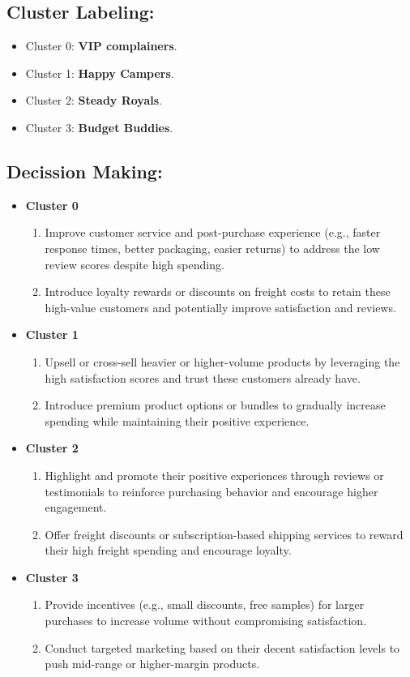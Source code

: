 \documentclass[a4paper,12pt]{article}
\begin{document}
\subsection{Cluster Labeling:}
\begin{itemize}
    \item Cluster 0: \textbf{VIP complainers}.
    \item Cluster 1: \textbf{Happy Campers}.
    \item Cluster 2: \textbf{Steady Royals}.
    \item Cluster 3: \textbf{Budget Buddies}.
\end{itemize}

\subsection*{Decission Making:}
\begin{itemize}
    \item \textbf{Cluster 0}
    \begin{enumerate}
        \item Improve customer service and post-purchase experience (e.g., faster response times, better packaging, easier returns) to address the low review scores despite high spending.
        \item Introduce loyalty rewards or discounts on freight costs to retain these high-value customers and potentially improve satisfaction and reviews.
    \end{enumerate}

    \item \textbf{Cluster 1}
    \begin{enumerate}
        \item Upsell or cross-sell heavier or higher-volume products by leveraging the high satisfaction scores and trust these customers already have.
        \item Introduce premium product options or bundles to gradually increase spending while maintaining their positive experience.
    \end{enumerate}

    \item \textbf{Cluster 2}
    \begin{enumerate}
        \item Highlight and promote their positive experiences through reviews or testimonials to reinforce purchasing behavior and encourage higher engagement.
        \item Offer freight discounts or subscription-based shipping services to reward their high freight spending and encourage loyalty.
    \end{enumerate}

    \item \textbf{Cluster 3}
    \begin{enumerate}
        \item Provide incentives (e.g., small discounts, free samples) for larger purchases to increase volume without compromising satisfaction.
        \item Conduct targeted marketing based on their decent satisfaction levels to push mid-range or higher-margin products.
    \end{enumerate}
\end{itemize}
\end{document}
